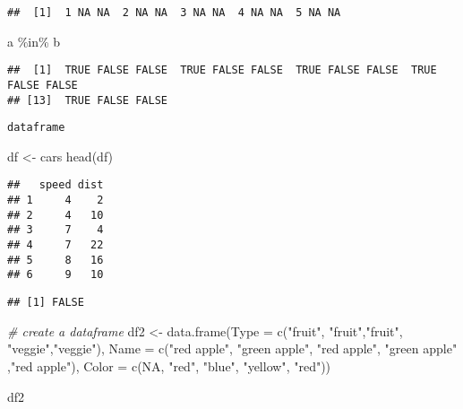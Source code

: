 \documentclass[
]{book}
\newenvironment{Shaded}{\begin{snugshade}}{\end{snugshade}}
\newcommand{\AttributeTok}[1]{\textcolor[rgb]{0.77,0.63,0.00}{#1}}
\newcommand{\CommentTok}[1]{\textcolor[rgb]{0.56,0.35,0.01}{\textit{#1}}}
\newcommand{\ConstantTok}[1]{\textcolor[rgb]{0.00,0.00,0.00}{#1}}
\newcommand{\DecValTok}[1]{\textcolor[rgb]{0.00,0.00,0.81}{#1}}
\newcommand{\FunctionTok}[1]{\textcolor[rgb]{0.00,0.00,0.00}{#1}}
\newcommand{\NormalTok}[1]{#1}
\newcommand{\OtherTok}[1]{\textcolor[rgb]{0.56,0.35,0.01}{#1}}
\newcommand{\SpecialCharTok}[1]{\textcolor[rgb]{0.00,0.00,0.00}{#1}}
\newcommand{\StringTok}[1]{\textcolor[rgb]{0.31,0.60,0.02}{#1}}
\begin{document}
\begin{verbatim}
##  [1]  1 NA NA  2 NA NA  3 NA NA  4 NA NA  5 NA NA
\end{verbatim}

\begin{Shaded}
\begin{Highlighting}[]
\NormalTok{a }\SpecialCharTok{\%in\%}\NormalTok{ b}
\end{Highlighting}
\end{Shaded}

\begin{verbatim}
##  [1]  TRUE FALSE FALSE  TRUE FALSE FALSE  TRUE FALSE FALSE  TRUE FALSE FALSE
## [13]  TRUE FALSE FALSE
\end{verbatim}

\texttt{dataframe}

\begin{Shaded}
\begin{Highlighting}[]
\NormalTok{df }\OtherTok{\textless{}{-}}\NormalTok{ cars}
\FunctionTok{head}\NormalTok{(df)}
\end{Highlighting}
\end{Shaded}

\begin{verbatim}
##   speed dist
## 1     4    2
## 2     4   10
## 3     7    4
## 4     7   22
## 5     8   16
## 6     9   10
\end{verbatim}

\begin{Shaded}
\end{Shaded}

\begin{verbatim}
## [1] FALSE
\end{verbatim}

\begin{Shaded}
\begin{Highlighting}[]
\CommentTok{\# create a dataframe}
\NormalTok{df2 }\OtherTok{\textless{}{-}} \FunctionTok{data.frame}\NormalTok{(}\AttributeTok{Type =} \FunctionTok{c}\NormalTok{(}\StringTok{"fruit"}\NormalTok{, }\StringTok{"fruit"}\NormalTok{,}\StringTok{"fruit"}\NormalTok{, }\StringTok{"veggie"}\NormalTok{,}\StringTok{"veggie"}\NormalTok{),}
                  \AttributeTok{Name =} \FunctionTok{c}\NormalTok{(}\StringTok{"red apple"}\NormalTok{, }\StringTok{"green apple"}\NormalTok{, }\StringTok{"red apple"}\NormalTok{, }\StringTok{"green apple"}\NormalTok{ ,}\StringTok{"red apple"}\NormalTok{), }\AttributeTok{Color =} \FunctionTok{c}\NormalTok{(}\ConstantTok{NA}\NormalTok{, }\StringTok{"red"}\NormalTok{, }\StringTok{"blue"}\NormalTok{, }\StringTok{"yellow"}\NormalTok{, }\StringTok{"red"}\NormalTok{))}

\NormalTok{df2}
\end{Highlighting}
\end{Shaded}
\end{document}
